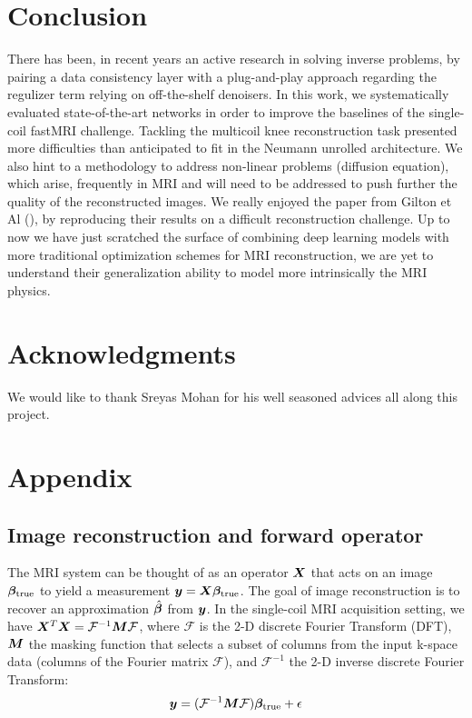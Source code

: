 \documentclass{article}
\begin{document}
\section{Conclusion}
There has been, in recent years an active research in solving inverse problems, by pairing a data consistency layer with a plug-and-play approach regarding the regulizer term relying on off-the-shelf denoisers. In this work, we systematically evaluated state-of-the-art networks in order to improve the baselines of the single-coil fastMRI challenge. Tackling the multicoil knee reconstruction task presented more difficulties than anticipated to fit in the Neumann unrolled architecture. We also hint to a methodology to address non-linear problems (diffusion equation), which arise, frequently in MRI and will need to be addressed  to push further the quality of the reconstructed images. We really enjoyed the paper from Gilton et Al (\cite{DBLP:journals/corr/abs-1901-03707}), by reproducing their results on a difficult reconstruction challenge. Up to now we have just scratched the surface of combining deep learning models with more traditional optimization schemes for MRI reconstruction, we are yet to understand their generalization ability to model more intrinsically the MRI physics.

\section{Acknowledgments}
We would like to thank Sreyas Mohan for his well seasoned advices all along this project.
\newpage
\nocite{*}



\section{Appendix}
\subsection{Image reconstruction and forward operator}
The MRI system can be thought of as an operator $\bm{X}$ that acts on an image $\bm{\beta}_{\text{true}}$ to yield a measurement $\bm{y}= \bm{X} \bm{\beta}_{\text{true}}$.
The goal of image reconstruction is to recover an approximation $\hat{\bm{\beta}}$ from $\bm{y}$.
In the single-coil MRI acquisition setting, we have $\bm{X}^T \bm{X} = \mathcal{F}^{-1} \bm{M} \mathcal{F}$, where $\mathcal{F}$ is the 2-D discrete Fourier Transform (DFT), $\bm{M}$ the masking function that selects a subset of columns from the input k-space data (columns of the Fourier matrix  $\mathcal{F}$), and $\mathcal{F}^{-1}$ the 2-D inverse discrete Fourier Transform:
$$
	\bm{y}	= (\mathcal{F}^{-1} \bm{M} \mathcal{F}) \bm{\beta}_{\text{true}} + \epsilon			
$$
 
\end{document}

